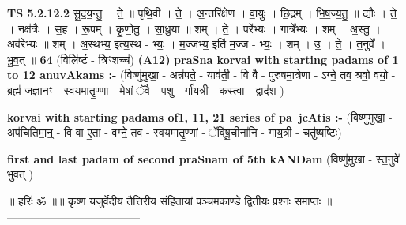 \documentclass[17pt]{extarticle}
\begin{document}
                                \textbf{ TS 5.2.12.2} \newline
                  सू॒द॒य॒न्तु॒ । ते॒ ॥ पृ॒थि॒वी । ते॒ । अ॒न्तरि॑क्षेण । वा॒युः । छि॒द्रम् । भि॒ष॒ज्य॒तु॒ ॥ द्यौः । ते॒ । नक्ष॑त्रैः । स॒ह । रू॒पम् । कृ॒णो॒तु॒ । सा॒धु॒या ॥ शम् । ते॒ । परे᳚भ्यः । गात्रे᳚भ्यः । शम् । अ॒स्तु॒ । अव॑रेभ्यः ॥ शम् । अ॒स्थभ्य॒ इत्य॒स्थ - भ्यः॒ । म॒ज्जभ्य॒ इति॑ म॒ज्ज - भ्यः॒ । शम् । उ॒ । ते॒ । त॒नुवे᳚ । भु॒व॒त् ॥ \textbf{  64} \newline
                  \newline
                      (विलि॑ष्टं - त्रिꣳ॒॒शच्च॑)  \textbf{(A12)} \newline \newline
\textbf{praSna korvai with starting padams of 1 to 12 anuvAkams :-} \newline
(विष्णु॑मुखा॒ - अन्न॑पते॒ - याव॑ती॒ - वि वै - पु॑रुषमा॒त्रेणा - ऽग्ने॒ तव॒ श्रवो॒ वयो॒ - ब्रह्म॑ जज्ञा॒नꣳ - स्व॑यमातृ॒ण्णा - मे॒षां ॅवै - प॒शु - र्गा॑य॒त्री - कस्त्वा॒ - द्वाद॑श ) \newline

\textbf{korvai with starting padams of1, 11, 21 series of pa~jcAtis :-} \newline
(विष्णु॑मुखा॒ - अप॑चितिमा॒न्॒ - वि वा ए॒ता - वग्ने॒ तव॑ - स्वयमातृ॒ण्णां - ॅवि॑षू॒चीना॑नि - गाय॒त्री - चतु॑ष्षष्टिः) \newline

\textbf{first and last padam of second praSnam of 5th kANDam} \newline
(विष्णु॑मुखा - स्त॒नुवे॑ भुवत् ) \newline 


॥ हरिः॑ ॐ ॥॥ कृष्ण यजुर्वेदीय तैत्तिरीय संहितायां पञ्चमकाण्डे द्वितीयः प्रश्नः समाप्तः ॥
------------------------------------ \newline
\pagebreak
\pagebreak
        
\end{document}
